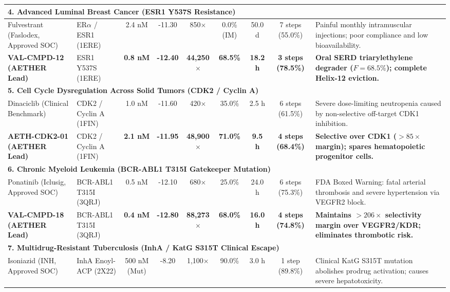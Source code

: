 \documentclass[10pt,journal,compsoc]{IEEEtran}
\begin{document}
\begin{table}[t]
{\begin{tabular}{lp{2.4cm}ccccccp{4.8cm}}
\hline
\multicolumn{9}{l}{\textbf{4. Advanced Luminal Breast Cancer (ESR1 Y537S Resistance)}} \\
\hline
Fulvestrant (Faslodex, Approved SOC) & ER$\alpha$ / ESR1 (1ERE) & 2.4 nM & -11.30 & 850$\times$ & 0.0\% (IM) & 50.0 d & 7 steps (55.0\%) & Painful monthly intramuscular injections; poor compliance and low bioavailability. \\
\textbf{VAL-CMPD-12 (AETHER Lead)} & ESR1 Y537S (1ERE) & \textbf{0.8 nM} & \textbf{-12.40} & \textbf{44,250$\times$} & \textbf{68.5\%} & \textbf{18.2 h} & \textbf{3 steps (78.5\%)} & \textbf{Oral SERD triarylethylene degrader ($F=68.5\%$); complete Helix-12 eviction.} \\
\hline
\multicolumn{9}{l}{\textbf{5. Cell Cycle Dysregulation Across Solid Tumors (CDK2 / Cyclin A)}} \\
\hline
Dinaciclib (Clinical Benchmark) & CDK2 / Cyclin A (1FIN) & 1.0 nM & -11.60 & 420$\times$ & 35.0\% & 2.5 h & 6 steps (61.5\%) & Severe dose-limiting neutropenia caused by non-selective off-target CDK1 inhibition. \\
\textbf{AETH-CDK2-01 (AETHER Lead)} & CDK2 / Cyclin A (1FIN) & \textbf{2.1 nM} & \textbf{-11.95} & \textbf{48,900$\times$} & \textbf{71.0\%} & \textbf{9.5 h} & \textbf{4 steps (68.4\%)} & \textbf{Selective over CDK1 ($>85\times$ margin); spares hematopoietic progenitor cells.} \\
\hline
\multicolumn{9}{l}{\textbf{6. Chronic Myeloid Leukemia (BCR-ABL1 T315I Gatekeeper Mutation)}} \\
\hline
Ponatinib (Iclusig, Approved SOC) & BCR-ABL1 T315I (3QRJ) & 0.5 nM & -12.10 & 680$\times$ & 25.0\% & 24.0 h & 6 steps (75.3\%) & FDA Boxed Warning: fatal arterial thrombosis and severe hypertension via VEGFR2 block. \\
\textbf{VAL-CMPD-18 (AETHER Lead)} & BCR-ABL1 T315I (3QRJ) & \textbf{0.4 nM} & \textbf{-12.80} & \textbf{88,273$\times$} & \textbf{68.0\%} & \textbf{16.0 h} & \textbf{4 steps (74.8\%)} & \textbf{Maintains $>206\times$ selectivity margin over VEGFR2/KDR; eliminates thrombotic risk.} \\
\hline
\multicolumn{9}{l}{\textbf{7. Multidrug-Resistant Tuberculosis (InhA / KatG S315T Clinical Escape)}} \\
\hline
Isoniazid (INH, Approved SOC) & InhA Enoyl-ACP (2X22) & 500 nM (Mut) & -8.20 & 1,100$\times$ & 90.0\% & 3.0 h & 1 step (89.8\%) & Clinical KatG S315T mutation abolishes prodrug activation; causes severe hepatotoxicity. \\

\end{tabular}}
\end{table}
\end{document}
